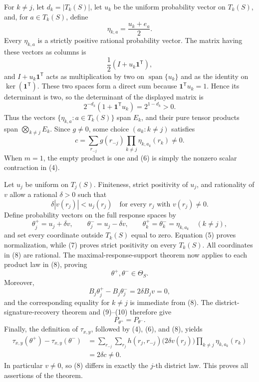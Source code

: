 For \(k\ne j\), let \(d_k=|T_k(S)|\), let \(u_k\) be the uniform probability vector on \(T_k(S)\), and, for \(a\in T_k(S)\), define
\[
\eta_{k,a}=\frac{u_k+e_a}{2}.
\]
Every \(\eta_{k,a}\) is a strictly positive rational probability vector.  The matrix having these vectors as columns is
\[
\frac12\left(I+u_k\mathbf 1^{\mathsf T}\right),
\]
and \(I+u_k\mathbf 1^{\mathsf T}\) acts as multiplication by two on \(\operatorname{span}\{u_k\}\) and as the identity on \(\ker(\mathbf 1^{\mathsf T})\).  These two spaces form a direct sum because \(\mathbf 1^{\mathsf T}u_k=1\).  Hence its determinant is two, so the determinant of the displayed matrix is
\[
2^{-d_k}\left(1+\mathbf 1^{\mathsf T}u_k\right)=2^{1-d_k}>0.
\]
Thus the vectors \(\{\eta_{k,a}:a\in T_k(S)\}\) span \(E_k\), and their pure tensor products span \(\bigotimes_{k\ne j}E_k\).  Since \(g\ne0\), some choice \((a_k:k\ne j)\) satisfies
\[
c=\sum_{r_{-j}}g(r_{-j})
       \prod_{k\ne j}\eta_{k,a_k}(r_k)\ne0.                 \tag{6}
\]
When \(m=1\), the empty product is one and (6) is simply the nonzero scalar contraction in (4).

Let \(u_j\) be uniform on \(T_j(S)\).  Finiteness, strict positivity of \(u_j\), and rationality of \(v\) allow a rational \(\delta>0\) such that
\[
\delta |v(r_j)|<u_j(r_j)
\quad\text{for every }r_j\text{ with }v(r_j)\ne0.            \tag{7}
\]
Define probability vectors on the full response spaces by
\[
\theta_j^+=u_j+\delta v,
\qquad
\theta_j^-=u_j-\delta v,
\qquad
\theta_k^+=\theta_k^-=\eta_{k,a_k}\quad(k\ne j),             \tag{8}
\]
and set every coordinate outside \(T_k(S)\) equal to zero.  Equation (5) proves normalization, while (7) proves strict positivity on every \(T_k(S)\).  All coordinates in (8) are rational.  The maximal-response-support theorem now applies to each product law in (8), proving
\[
\theta^+,\theta^-\in\Theta_S.                                \tag{9}
\]
Moreover,
\[
B_j\theta_j^+-B_j\theta_j^-=2\delta B_jv=0,                  \tag{10}
\]
and the corresponding equality for \(k\ne j\) is immediate from (8).  The district-signature-recovery theorem and (9)--(10) therefore give
\[
P_{\theta^+}=P_{\theta^-}.                                   \tag{11}
\]
Finally, the definition of \(\tau_{x,y}\), followed by (4), (6), and (8), yields
\[
\begin{aligned}
\tau_{x,y}(\theta^+)-\tau_{x,y}(\theta^-)
&=\sum_{r_{-j}}\sum_{r_j}h(r_j,r_{-j})
  \bigl(2\delta v(r_j)\bigr)
  \prod_{k\ne j}\eta_{k,a_k}(r_k)\\
&=2\delta c\ne0.                                             \tag{12}
\end{aligned}
\]
In particular \(v\ne0\), so (8) differs in exactly the \(j\)-th district law.  This proves all assertions of the theorem.

